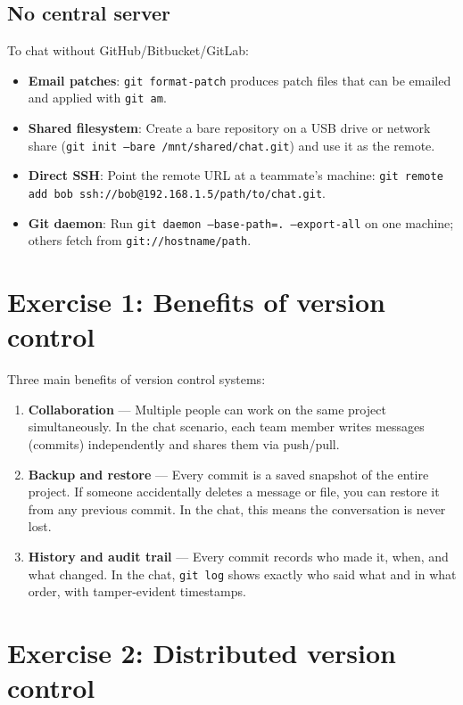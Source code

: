 \documentclass[twoside=false,DIV=14]{scrartcl}
\begin{document}
\subsection*{No central server}

To chat without GitHub/Bitbucket/GitLab:

\begin{itemize}
    \item \textbf{Email patches}: \texttt{git format-patch} produces patch files that can be emailed and applied with \texttt{git am}.
    \item \textbf{Shared filesystem}: Create a bare repository on a USB drive or network share (\texttt{git init --bare /mnt/shared/chat.git}) and use it as the remote.
    \item \textbf{Direct SSH}: Point the remote URL at a teammate's machine: \texttt{git remote add bob ssh://bob@192.168.1.5/path/to/chat.git}.
    \item \textbf{Git daemon}: Run \texttt{git daemon --base-path=. --export-all} on one machine; others fetch from \texttt{git://hostname/path}.
\end{itemize}

\section*{Exercise 1: Benefits of version control}

Three main benefits of version control systems:

\begin{enumerate}
    \item \textbf{Collaboration} --- Multiple people can work on the same project simultaneously.  In the chat scenario, each team member writes messages (commits) independently and shares them via push/pull.
    \item \textbf{Backup and restore} --- Every commit is a saved snapshot of the entire project.  If someone accidentally deletes a message or file, you can restore it from any previous commit.  In the chat, this means the conversation is never lost.
    \item \textbf{History and audit trail} --- Every commit records who made it, when, and what changed.  In the chat, \texttt{git log} shows exactly who said what and in what order, with tamper-evident timestamps.
\end{enumerate}

\section*{Exercise 2: Distributed version control}
\end{document}
